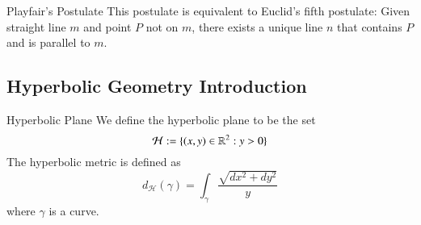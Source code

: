 \documentclass[12pt]{report}
\begin{document}
\begin{namthm}{Playfair's Postulate}{}
    This postulate is equivalent to Euclid's fifth postulate: Given straight line $m$ and point $P$ not on $m$, there exists a unique line $n$ that contains $P$ and is parallel to $m$.
\end{namthm}

\subsection{Hyperbolic Geometry Introduction}

\begin{defn}{Hyperbolic Plane}{}
    We define the hyperbolic plane to be the set \begin{equation}
        \mathcal{H} := \{(x,y) \in \mathbb R^2:y>0\}
    \end{equation}
    The hyperbolic metric is defined as \begin{equation}
        d_{\mathcal{H}}(\gamma) = \int_{\gamma}\frac{\sqrt{dx^2+dy^2}}{y}
    \end{equation}
    where $\gamma$ is a curve.
\end{defn}
\end{document}
